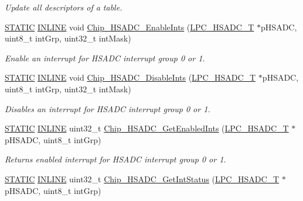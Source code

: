 \begin{DoxyCompactItemize}
\begin{DoxyCompactList}\small\item\em Update all descriptors of a table. \end{DoxyCompactList}\item 
\hyperlink{group___l_p_c___types___public___macros_ga10b2d890d871e1489bb02b7e70d9bdfb}{S\+T\+A\+T\+IC} \hyperlink{spifi__18xx__43xx_8h_a2eb6f9e0395b47b8d5e3eeae4fe0c116}{I\+N\+L\+I\+NE} void \hyperlink{group___h_s_a_d_c__18_x_x__43_x_x_ga24e4d3b6c692290b746f93933e7d8468}{Chip\+\_\+\+H\+S\+A\+D\+C\+\_\+\+Enable\+Ints} (\hyperlink{struct_l_p_c___h_s_a_d_c___t}{L\+P\+C\+\_\+\+H\+S\+A\+D\+C\+\_\+T} $\ast$p\+H\+S\+A\+DC, uint8\+\_\+t int\+Grp, uint32\+\_\+t int\+Mask)
\begin{DoxyCompactList}\small\item\em Enable an interrupt for H\+S\+A\+DC interrupt group 0 or 1. \end{DoxyCompactList}\item 
\hyperlink{group___l_p_c___types___public___macros_ga10b2d890d871e1489bb02b7e70d9bdfb}{S\+T\+A\+T\+IC} \hyperlink{spifi__18xx__43xx_8h_a2eb6f9e0395b47b8d5e3eeae4fe0c116}{I\+N\+L\+I\+NE} void \hyperlink{group___h_s_a_d_c__18_x_x__43_x_x_ga025dae344ffc8264013d51df110ddd3b}{Chip\+\_\+\+H\+S\+A\+D\+C\+\_\+\+Disable\+Ints} (\hyperlink{struct_l_p_c___h_s_a_d_c___t}{L\+P\+C\+\_\+\+H\+S\+A\+D\+C\+\_\+T} $\ast$p\+H\+S\+A\+DC, uint8\+\_\+t int\+Grp, uint32\+\_\+t int\+Mask)
\begin{DoxyCompactList}\small\item\em Disables an interrupt for H\+S\+A\+DC interrupt group 0 or 1. \end{DoxyCompactList}\item 
\hyperlink{group___l_p_c___types___public___macros_ga10b2d890d871e1489bb02b7e70d9bdfb}{S\+T\+A\+T\+IC} \hyperlink{spifi__18xx__43xx_8h_a2eb6f9e0395b47b8d5e3eeae4fe0c116}{I\+N\+L\+I\+NE} uint32\+\_\+t \hyperlink{group___h_s_a_d_c__18_x_x__43_x_x_ga7147bf5e39b3a6d90e949381b950e632}{Chip\+\_\+\+H\+S\+A\+D\+C\+\_\+\+Get\+Enabled\+Ints} (\hyperlink{struct_l_p_c___h_s_a_d_c___t}{L\+P\+C\+\_\+\+H\+S\+A\+D\+C\+\_\+T} $\ast$p\+H\+S\+A\+DC, uint8\+\_\+t int\+Grp)
\begin{DoxyCompactList}\small\item\em Returns enabled interrupt for H\+S\+A\+DC interrupt group 0 or 1. \end{DoxyCompactList}\item 
\hyperlink{group___l_p_c___types___public___macros_ga10b2d890d871e1489bb02b7e70d9bdfb}{S\+T\+A\+T\+IC} \hyperlink{spifi__18xx__43xx_8h_a2eb6f9e0395b47b8d5e3eeae4fe0c116}{I\+N\+L\+I\+NE} uint32\+\_\+t \hyperlink{group___h_s_a_d_c__18_x_x__43_x_x_gabbda546278f45c736514ca6491a7c3fd}{Chip\+\_\+\+H\+S\+A\+D\+C\+\_\+\+Get\+Int\+Status} (\hyperlink{struct_l_p_c___h_s_a_d_c___t}{L\+P\+C\+\_\+\+H\+S\+A\+D\+C\+\_\+T} $\ast$p\+H\+S\+A\+DC, uint8\+\_\+t int\+Grp)

\end{DoxyCompactItemize}
